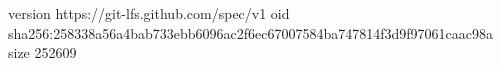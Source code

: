 version https://git-lfs.github.com/spec/v1
oid sha256:258338a56a4bab733ebb6096ac2f6ec67007584ba747814f3d9f97061caac98a
size 252609

